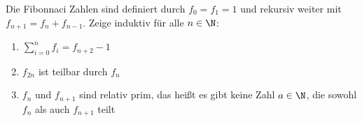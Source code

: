 \begin{exercise}
  Die Fibonnaci Zahlen sind definiert durch $f_0 = f_1 = 1$ und rekursiv
  weiter mit $f_{n+1} = f_n + f_{n-1}$. Zeige induktiv für alle $n \in \N$:
  \begin{enumerate}
  \item $\sum\limits_{ i= 0 }^{ n }{ f_i } = f_{n+2} - 1$
  \item $f_{2n}$ ist teilbar durch $f_n$
  \item $f_n$ und $f_{n+1}$ sind relativ prim, das heißt es gibt keine Zahl
    $a \in \N$, die sowohl $f_n$ als auch $f_{n+1}$ teilt
  \end{enumerate}
\end{exercise}
